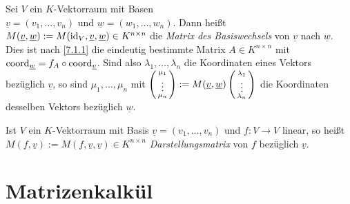 \documentclass[../../main.tex]{subfiles}
\begin{document}
\begin{defbem}\label{7.1.10}
Sei $V$ ein $K$-Vektorraum mit Basen\\
$\underline{v} = (v_1,\ldots,v_n)$ und $\underline{w} = (w_1,\ldots,w_n)$. Dann heißt $M(\underline{v},\underline{w}):= M(\operatorname{id}_V,\underline{v},\underline{w})\in K^{n\times n}$ die \emph{Matrix des Basiswechsels} von $\underline{v}$ nach $\underline{w}$. Dies ist nach \ref{7.1.1} die eindeutig bestimmte Matrix $A\in K^{n\times n}$ mit $\operatorname{coord}_{\underline{w}}  = f_A \circ \operatorname{coord}_{\underline{v}}$. Sind also $\lambda_1,\ldots,\lambda_n$ die Koordinaten eines Vektors bezüglich $\underline{v}$, so sind $\mu_1,\ldots,\mu_n$ mit $\left(\begin{smallmatrix}\mu_1\\\vdots\\\mu_n\end{smallmatrix}\right):= M(\underline{v},\underline{w})\left(\begin{smallmatrix}\lambda_1\\\vdots\\\lambda_n\end{smallmatrix}\right)$ die Koordinaten desselben Vektors bezüglich $\underline{w}$.
\end{defbem}

\begin{df}\label{7.1.11}
Ist $V$ ein $K$-Vektorraum mit Basis $\underline{v} = (v_1,\ldots,v_n)$ und $f: V \to V$ linear, so heißt $M(f,\underline{v}) := M(f,\underline{v},\underline{v})\in K^{n\times n}$ \emph{Darstellungsmatrix} von $f$ bezüglich $\underline{v}$.
\end{df}


\section{Matrizenkalkül}
\end{document}
